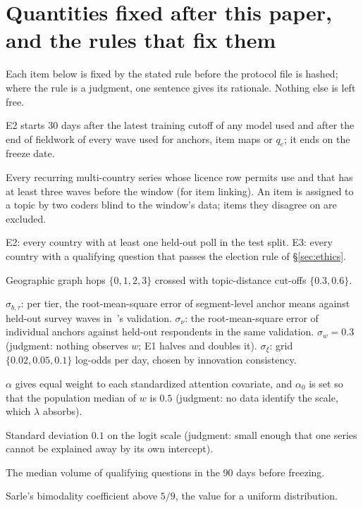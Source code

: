 \documentclass[10pt]{article}
\theoremstyle{remark}
\begin{document}
\section{Quantities fixed after this paper, and the rules that fix them}
\label{app:deferred}
Each item below is fixed by the stated rule before the protocol file is hashed; where the rule is a judgment, one sentence gives its rationale. Nothing else is left free.
\begin{description}
\setlength\itemsep{1pt}
\item[Window.] E2 starts 30 days after the latest training cutoff of any model used and after the end of fieldwork of every wave used for anchors, item maps or $q_e$; it ends on the freeze date.
\item[Poll series and items.] Every recurring multi-country series whose licence row permits use and that has at least three waves before the window (for item linking). An item is assigned to a topic by two coders blind to the window's data; items they disagree on are excluded.
\item[Countries.] E2: every country with at least one held-out poll in the test split. E3: every country with a qualifying question that passes the election rule of \S\ref{sec:ethics}.
\item[Localization radius grid.] Geographic graph hops $\{0,1,2,3\}$ crossed with topic-distance cut-offs $\{0.3,0.6\}$.
\item[Prior and noise scales.] $\sigma_{b,\tau}$: per tier, the root-mean-square error of segment-level anchor means against held-out survey waves in~\cite{rw_unequally}'s validation. $\sigma_\nu$: the root-mean-square error of individual anchors against held-out respondents in the same validation. $\sigma_w=0.3$ (judgment: nothing observes $w$; E1 halves and doubles it). $\sigma_\xi$: grid $\{0.02,0.05,0.1\}$ log-odds per day, chosen by innovation consistency.
\item[Susceptibility coefficients.] $\alpha$ gives equal weight to each standardized attention covariate, and $\alpha_0$ is set so that the population median of $w$ is $0.5$ (judgment: no data identify the scale, which $\lambda$ absorbs).
\item[Market intercept prior.] Standard deviation $0.1$ on the logit scale (judgment: small enough that one series cannot be explained away by its own intercept).
\item[Liquidity threshold.] The median volume of qualifying questions in the 90 days before freezing.
\item[$L_3$ switch (A2).] Sarle's bimodality coefficient above $5/9$, the value for a uniform distribution.

\end{description}
\end{document}
